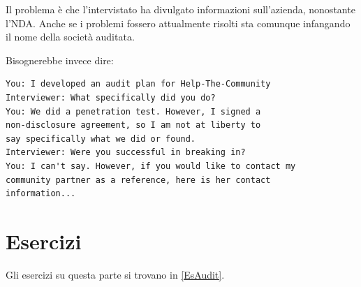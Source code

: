 Il problema è che l'intervistato ha divulgato informazioni sull'azienda,
nonostante l'NDA. Anche se i problemi fossero attualmente risolti sta comunque
infangando il nome della società auditata.


Bisognerebbe invece dire:
\begin{verbatim}
You: I developed an audit plan for Help-The-Community
Interviewer: What specifically did you do?
You: We did a penetration test. However, I signed a
non-disclosure agreement, so I am not at liberty to
say specifically what we did or found.
Interviewer: Were you successful in breaking in?
You: I can't say. However, if you would like to contact my
community partner as a reference, here is her contact
information...
\end{verbatim}

\section{Esercizi}
Gli esercizi su questa parte si trovano in \ref{EsAudit}.
















